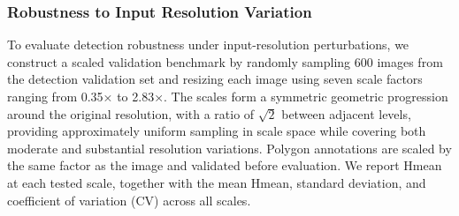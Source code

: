 \documentclass[11pt, a4paper,logo,  copyright, nonumbering]{paddleocr}
\begin{document}
\subsubsection{Robustness to Input Resolution Variation}

To evaluate detection robustness under input-resolution perturbations, we construct a scaled validation benchmark by randomly sampling 600 images from the detection validation set and resizing each image using seven scale factors ranging from 0.35× to 2.83×. The scales form a symmetric geometric progression around the original resolution, with a ratio of $\sqrt{2}$ between adjacent levels, providing approximately uniform sampling in scale space while covering both moderate and substantial resolution variations. Polygon annotations are scaled by the same factor as the image and validated before evaluation. We report Hmean at each tested scale, together with the mean Hmean, standard deviation, and coefficient of variation (CV) across all scales.
\end{document}
